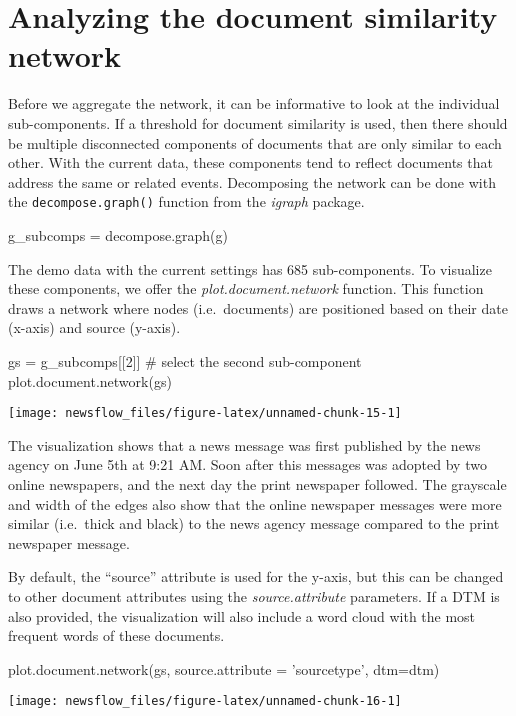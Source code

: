 \section{Analyzing the document similarity network}

Before we aggregate the network, it can be informative to look at the
individual sub-components. If a threshold for document similarity is
used, then there should be multiple disconnected components of documents
that are only similar to each other. With the current data, these
components tend to reflect documents that address the same or related
events. Decomposing the network can be done with the
\texttt{decompose.graph()} function from the \emph{igraph} package.

\begin{Schunk}
\begin{Sinput}
g_subcomps = decompose.graph(g)
\end{Sinput}
\end{Schunk}

The demo data with the current settings has 685 sub-components. To
visualize these components, we offer the \emph{plot.document.network}
function. This function draws a network where nodes (i.e.~documents) are
positioned based on their date (x-axis) and source (y-axis).

\begin{Schunk}
\begin{Sinput}
gs = g_subcomps[[2]] # select the second sub-component
plot.document.network(gs)
\end{Sinput}

\texttt{[image: newsflow\_files/figure-latex/unnamed-chunk-15-1]} \end{Schunk}

The visualization shows that a news message was first published by the
news agency on June 5th at 9:21 AM. Soon after this messages was adopted
by two online newspapers, and the next day the print newspaper followed.
The grayscale and width of the edges also show that the online newspaper
messages were more similar (i.e.~thick and black) to the news agency
message compared to the print newspaper message.

By default, the ``source'' attribute is used for the y-axis, but this
can be changed to other document attributes using the
\emph{source.attribute} parameters. If a DTM is also provided, the
visualization will also include a word cloud with the most frequent
words of these documents.

\begin{Schunk}
\begin{Sinput}
plot.document.network(gs, source.attribute = 'sourcetype', dtm=dtm)
\end{Sinput}

\texttt{[image: newsflow\_files/figure-latex/unnamed-chunk-16-1]} \end{Schunk}

